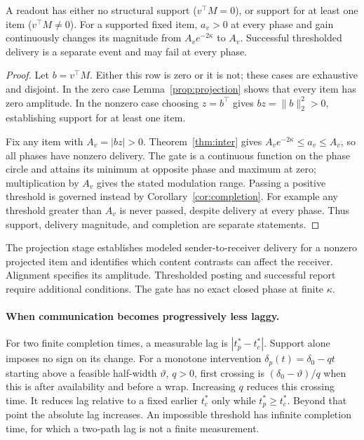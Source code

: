 \documentclass[submission,nolinenumbers]{esj}
\begin{document}
\begin{proposition}\label{prop:twostage}
A readout has either no structural support ($v^\top M=0$), or support for at least one item ($v^\top M\ne0$). For a supported fixed item, $a_v>0$ at every phase and gain continuously changes its magnitude from $A_ve^{-2\kappa}$ to $A_v$. Successful thresholded delivery is a separate event and may fail at every phase.
\end{proposition}
\begin{proof}
Let $b=v^\top M$. Either this row is zero or it is not; these cases are exhaustive and disjoint. In the zero case Lemma~\ref{prop:projection} shows that every item has zero amplitude. In the nonzero case choosing $z=b^\top$ gives $bz=\|b\|_2^2>0$, establishing support for at least one item.

Fix any item with $A_v=|bz|>0$. Theorem~\ref{thm:inter} gives $A_ve^{-2\kappa}\le a_v\le A_v$, so all phases have nonzero delivery. The gate is a continuous function on the phase circle and attains its minimum at opposite phase and maximum at zero; multiplication by $A_v$ gives the stated modulation range. Passing a positive threshold is governed instead by Corollary~\ref{cor:completion}. For example any threshold greater than $A_v$ is never passed, despite delivery at every phase. Thus support, delivery magnitude, and completion are separate statements.
\end{proof}
The projection stage establishes modeled sender-to-receiver delivery for a nonzero projected item and identifies which content contrasts can affect the receiver. Alignment specifies its amplitude. Thresholded posting and successful report require additional conditions. The gate has no exact closed phase at finite $\kappa$.

\paragraph{When communication becomes progressively less laggy.}
For two finite completion times, a measurable lag is $|t_p^*-t_c^*|$. Support alone imposes no sign on its change. For a monotone intervention $\delta_p(t)=\delta_0-qt$ starting above a feasible half-width $\vartheta$, $q>0$, first crossing is $(\delta_0-\vartheta)/q$ when this is after availability and before a wrap. Increasing $q$ reduces this crossing time. It reduces lag relative to a fixed earlier $t_c^*$ only while $t_p^*\ge t_c^*$. Beyond that point the absolute lag increases. An impossible threshold has infinite completion time, for which a two-path lag is not a finite measurement.
\end{document}
